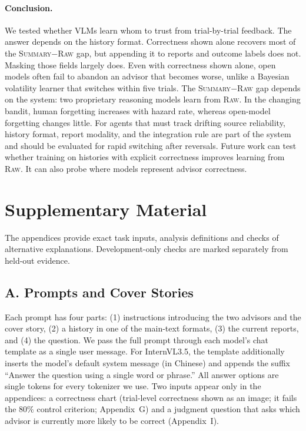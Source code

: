 \documentclass[letterpaper]{article} %
\newcommand{\Raw}{\textsc{Raw}}
\newcommand{\Summary}{\textsc{Summary}}
\begin{document}
\paragraph{Conclusion.} We tested whether VLMs learn whom to trust from trial-by-trial feedback. The answer depends on the history format. Correctness shown alone recovers most of the \Summary{}$-$\Raw{} gap, but appending it to reports and outcome labels does not. Masking those fields largely does. Even with correctness shown alone, open models often fail to abandon an advisor that becomes worse, unlike a Bayesian volatility learner that switches within five trials. The \Summary{}$-$\Raw{} gap depends on the system: two proprietary reasoning models learn from \Raw{}. In the changing bandit, human forgetting increases with hazard rate, whereas open-model forgetting changes little. For agents that must track drifting source reliability, history format, report modality, and the integration rule are part of the system and should be evaluated for rapid switching after reversals. Future work can test whether training on histories with explicit correctness improves learning from \Raw{}. It can also probe where models represent advisor correctness.



\appendix
\section{Supplementary Material}
The appendices provide exact task inputs, analysis definitions and checks of alternative explanations. Development-only checks are marked separately from held-out evidence.

\subsection{A. Prompts and Cover Stories}
Each prompt has four parts: (1) instructions introducing the two advisors and the cover story, (2) a history in one of the main-text formats, (3) the current reports, and (4) the question. We pass the full prompt through each model's chat template as a single user message. For InternVL3.5, the template additionally inserts the model's default system message (in Chinese) and appends the suffix ``Answer the question using a single word or phrase.'' All answer options are single tokens for every tokenizer we use. Two inputs appear only in the appendices: a correctness chart (trial-level correctness shown as an image; it fails the 80\% control criterion; Appendix~G) and a judgment question that asks which advisor is currently more likely to be correct (Appendix~I).
\end{document}
